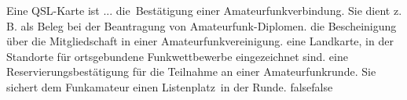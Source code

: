     {Eine QSL-Karte ist ...}
    {die Bestätigung einer Amateurfunkverbindung. Sie dient z. B. als Beleg bei der Beantragung von Amateurfunk-Diplomen.}
    {die Bescheinigung über die Mitgliedschaft in einer Amateurfunkvereinigung.}
    {eine Landkarte, in der Standorte für ortsgebundene Funkwettbewerbe eingezeichnet sind.}
    {eine Reservierungsbestätigung für die Teilnahme an einer Amateurfunkrunde. Sie sichert dem Funkamateur einen Listenplatz in der Runde.}
    {false}{false}
